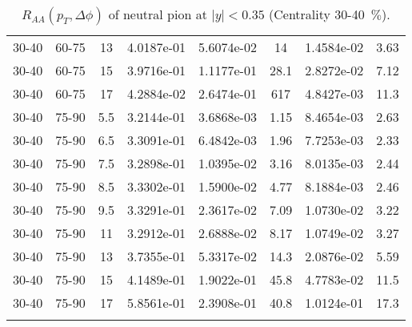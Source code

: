\begin{longtable}{|cccccccc|}
30-40 & 60-75 & 13 & 4.0187e-01 & 5.6074e-02 & 14 & 1.4584e-02 & 3.63 \\ 
30-40 & 60-75 & 15 & 3.9716e-01 & 1.1177e-01 & 28.1 & 2.8272e-02 & 7.12 \\ 
30-40 & 60-75 & 17 & 4.2884e-02 & 2.6474e-01 & 617 & 4.8427e-03 & 11.3 \\ 
\hline
30-40 & 75-90 & 5.5 & 3.2144e-01 & 3.6868e-03 & 1.15 & 8.4654e-03 & 2.63 \\ 
30-40 & 75-90 & 6.5 & 3.3091e-01 & 6.4842e-03 & 1.96 & 7.7253e-03 & 2.33 \\ 
30-40 & 75-90 & 7.5 & 3.2898e-01 & 1.0395e-02 & 3.16 & 8.0135e-03 & 2.44 \\ 
30-40 & 75-90 & 8.5 & 3.3302e-01 & 1.5900e-02 & 4.77 & 8.1884e-03 & 2.46 \\ 
30-40 & 75-90 & 9.5 & 3.3291e-01 & 2.3617e-02 & 7.09 & 1.0730e-02 & 3.22 \\ 
30-40 & 75-90 & 11 & 3.2912e-01 & 2.6888e-02 & 8.17 & 1.0749e-02 & 3.27 \\ 
30-40 & 75-90 & 13 & 3.7355e-01 & 5.3317e-02 & 14.3 & 2.0876e-02 & 5.59 \\ 
30-40 & 75-90 & 15 & 4.1489e-01 & 1.9022e-01 & 45.8 & 4.7783e-02 & 11.5 \\ 
30-40 & 75-90 & 17 & 5.8561e-01 & 2.3908e-01 & 40.8 & 1.0124e-01 & 17.3 \\ 
\hline
\caption{$R_{AA}(p_{T},\Delta\phi)$ of neutral pion at $|y|<0.35$ (Centrality 30-40~$\%$).}
\end{longtable}
            

